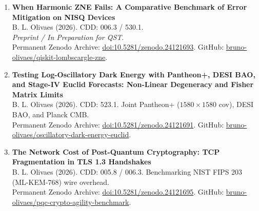 \documentclass[10pt,a4paper]{article}
\begin{document}
\begin{enumerate}
    \item \textbf{When Harmonic ZNE Fails: A Comparative Benchmark of Error Mitigation on NISQ Devices}\\
    B. L. Olivaes (2026). CDD: 006.3 / 530.1.\\
    \textit{Preprint / In Preparation for QST}.\\
    Permanent Zenodo Archive: \href{https://doi.org/10.5281/zenodo.24121693}{doi:10.5281/zenodo.24121693}. GitHub: \href{https://github.com/bruno-olivaes/qiskit-lombscargle-zne}{bruno-olivaes/qiskit-lombscargle-zne}.

    \item \textbf{Testing Log-Oscillatory Dark Energy with Pantheon+, DESI BAO, and Stage-IV Euclid Forecasts: Non-Linear Degeneracy and Fisher Matrix Limits}\\
    B. L. Olivaes (2026). CDD: 523.1. Joint Pantheon+ ($1580\times 1580$ cov), DESI BAO, and Planck CMB.\\
    Permanent Zenodo Archive: \href{https://doi.org/10.5281/zenodo.24121691}{doi:10.5281/zenodo.24121691}. GitHub: \href{https://github.com/bruno-olivaes/oscillatory-dark-energy-euclid}{bruno-olivaes/oscillatory-dark-energy-euclid}.

    \item \textbf{The Network Cost of Post-Quantum Cryptography: TCP Fragmentation in TLS 1.3 Handshakes}\\
    B. L. Olivaes (2026). CDD: 005.8 / 006.3. Benchmarking NIST FIPS 203 (ML-KEM-768) wire overhead.\\
    Permanent Zenodo Archive: \href{https://doi.org/10.5281/zenodo.24121695}{doi:10.5281/zenodo.24121695}. GitHub: \href{https://github.com/bruno-olivaes/pqc-crypto-agility-benchmark}{bruno-olivaes/pqc-crypto-agility-benchmark}.
\end{enumerate}
\end{document}
